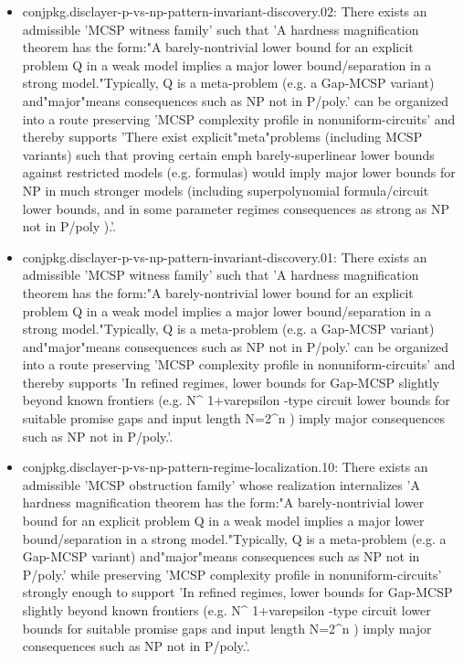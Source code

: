 \documentclass[11pt]{article}
\begin{document}
\begin{itemize}
\item conjpkg.disclayer-p-vs-np-pattern-invariant-discovery.02: There exists an admissible 'MCSP witness family' such that 'A hardness magnification theorem has the form:"A barely-nontrivial lower bound for an explicit problem Q in a weak model implies a major lower bound/separation in a strong model."Typically, Q is a meta-problem (e.g. a Gap-MCSP variant) and"major"means consequences such as NP not in P/poly.' can be organized into a route preserving 'MCSP complexity profile in nonuniform-circuits' and thereby supports 'There exist explicit"meta"problems (including MCSP variants) such that proving certain emph barely-superlinear lower bounds against restricted models (e.g. formulas) would imply major lower bounds for NP in much stronger models (including superpolynomial formula/circuit lower bounds, and in some parameter regimes consequences as strong as NP not in P/poly ).'.
\item conjpkg.disclayer-p-vs-np-pattern-invariant-discovery.01: There exists an admissible 'MCSP witness family' such that 'A hardness magnification theorem has the form:"A barely-nontrivial lower bound for an explicit problem Q in a weak model implies a major lower bound/separation in a strong model."Typically, Q is a meta-problem (e.g. a Gap-MCSP variant) and"major"means consequences such as NP not in P/poly.' can be organized into a route preserving 'MCSP complexity profile in nonuniform-circuits' and thereby supports 'In refined regimes, lower bounds for Gap-MCSP slightly beyond known frontiers (e.g. N\textasciicircum{} 1+varepsilon -type circuit lower bounds for suitable promise gaps and input length N=2\textasciicircum{}n ) imply major consequences such as NP not in P/poly.'.
\item conjpkg.disclayer-p-vs-np-pattern-regime-localization.10: There exists an admissible 'MCSP obstruction family' whose realization internalizes 'A hardness magnification theorem has the form:"A barely-nontrivial lower bound for an explicit problem Q in a weak model implies a major lower bound/separation in a strong model."Typically, Q is a meta-problem (e.g. a Gap-MCSP variant) and"major"means consequences such as NP not in P/poly.' while preserving 'MCSP complexity profile in nonuniform-circuits' strongly enough to support 'In refined regimes, lower bounds for Gap-MCSP slightly beyond known frontiers (e.g. N\textasciicircum{} 1+varepsilon -type circuit lower bounds for suitable promise gaps and input length N=2\textasciicircum{}n ) imply major consequences such as NP not in P/poly.'.

\end{itemize}
\end{document}
